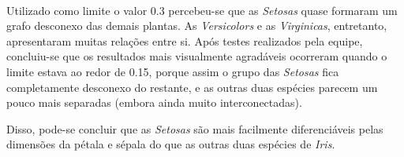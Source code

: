 \documentclass{article}
\begin{document}
        \paragraph{} Utilizado como limite o valor 0.3 percebeu-se que as {\it Setosas} quase formaram um grafo desconexo das demais plantas. As {\it Versicolors} e as {\it Virginicas}, entretanto, apresentaram muitas relações entre si. Após testes realizados pela equipe, concluiu-se que os resultados mais visualmente agradáveis ocorreram quando o limite estava ao redor de 0.15, porque assim o grupo das {\it Setosas} fica completamente desconexo do restante, e as outras duas espécies parecem um pouco mais separadas (embora ainda muito interconectadas).
		\par Disso, pode-se concluir que as {\it Setosas} são mais facilmente diferenciáveis pelas dimensões da pétala e sépala do que as outras duas espécies de {\it Iris}.
\end{document}
